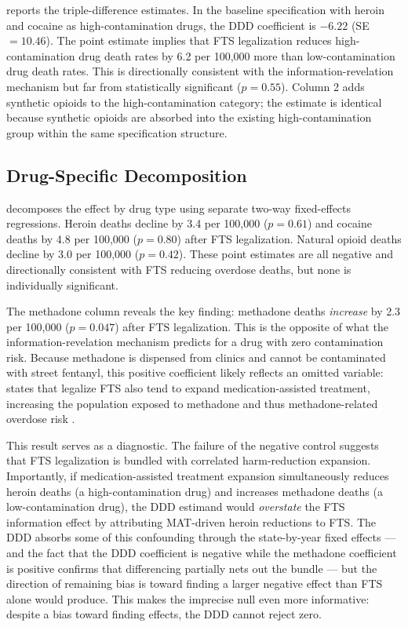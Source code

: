 \documentclass[12pt]{article}
\begin{document}


 reports the triple-difference estimates. In the baseline specification with heroin and cocaine as high-contamination drugs, the DDD coefficient is $-6.22$ (SE $= 10.46$). The point estimate implies that FTS legalization reduces high-contamination drug death rates by 6.2 per 100,000 more than low-contamination drug death rates. This is directionally consistent with the information-revelation mechanism but far from statistically significant ($p = 0.55$). Column 2 adds synthetic opioids to the high-contamination category; the estimate is identical because synthetic opioids are absorbed into the existing high-contamination group within the same specification structure.

\subsection{Drug-Specific Decomposition}



 decomposes the effect by drug type using separate two-way fixed-effects regressions. Heroin deaths decline by 3.4 per 100,000 ($p = 0.61$) and cocaine deaths by 4.8 per 100,000 ($p = 0.80$) after FTS legalization. Natural opioid deaths decline by 3.0 per 100,000 ($p = 0.42$). These point estimates are all negative and directionally consistent with FTS reducing overdose deaths, but none is individually significant.

The methadone column reveals the key finding: methadone deaths \textit{increase} by 2.3 per 100,000 ($p = 0.047$) after FTS legalization. This is the opposite of what the information-revelation mechanism predicts for a drug with zero contamination risk. Because methadone is dispensed from clinics and cannot be contaminated with street fentanyl, this positive coefficient likely reflects an omitted variable: states that legalize FTS also tend to expand medication-assisted treatment, increasing the population exposed to methadone and thus methadone-related overdose risk \citep{mattick2009, larochelle2018}.

This result serves as a diagnostic. The failure of the negative control suggests that FTS legalization is bundled with correlated harm-reduction expansion. Importantly, if medication-assisted treatment expansion simultaneously reduces heroin deaths (a high-contamination drug) and increases methadone deaths (a low-contamination drug), the DDD estimand would \textit{overstate} the FTS information effect by attributing MAT-driven heroin reductions to FTS. The DDD absorbs some of this confounding through the state-by-year fixed effects --- and the fact that the DDD coefficient is negative while the methadone coefficient is positive confirms that differencing partially nets out the bundle --- but the direction of remaining bias is toward finding a larger negative effect than FTS alone would produce. This makes the imprecise null even more informative: despite a bias toward finding effects, the DDD cannot reject zero.
\end{document}
